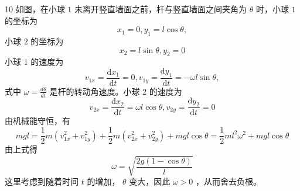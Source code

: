 \begin{solution}{10}
如图，在小球 $1$ 未离开竖直墙面之前，杆与竖直墙面之间夹角为 $\theta$ 时，小球 $1$ 的坐标为
\begin{equation}
x _ {1} = 0, y _ {1} = l \cos \theta ,
\label{eq:1.s10}
\end{equation}
小球 $2$ 的坐标为
\begin{equation}
x _ {2} = l \sin \theta , y _ {2} = 0
\label{eq:2.s10}
\end{equation}
小球 $1$ 的速度为
\begin{equation}
v _ {1 x} = \frac {\mathrm{d} x _ {1}}{\mathrm{d} t} = 0, v _ {1 y} = \frac {\mathrm{d} y _ {1}}{\mathrm{d} t} = - \omega l \sin \theta ,
\label{eq:3.s10}
\end{equation}
式中 $\omega=\frac{d\theta}{dt}$ 是杆的转动角速度。小球 $2$ 的速度为
\begin{equation}
v _ {2 x} = \frac {\mathrm{d} x _ {2}}{\mathrm{d} t} = \omega l \cos \theta , v _ {2 y} = \frac {\mathrm{d} y _ {2}}{\mathrm{d} t} = 0
\label{eq:4.s10}
\end{equation}
由机械能守恒，有
\begin{equation}
m g l = \frac {1}{2} m \left(v _ {1 x} ^ {2} + v _ {1 y} ^ {2}\right) + \frac {1}{2} m \left(v _ {2 x} ^ {2} + v _ {2 y} ^ {2}\right) + m g l \cos \theta = \frac {1}{2} m l ^ {2} \omega^ {2} + m g l \cos \theta 
\label{eq:5.s10}
\end{equation}
由上式得
\begin{equation}
\omega = \sqrt {\frac {2 g (1 - \cos \theta)}{l}}
\label{eq:6.s10}
\end{equation}
这里考虑到随着时间 $t$ 的增加， $\theta$ 变大，因此 $\omega > 0$ ，从而舍去负根。


\end{solution}

